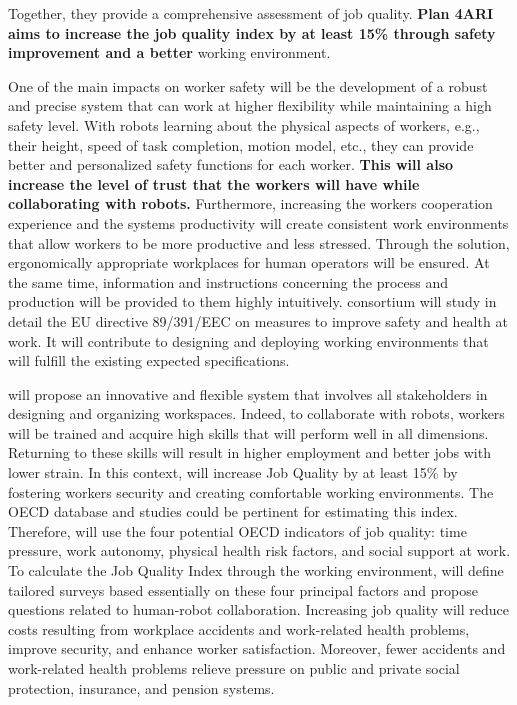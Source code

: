 Together, they provide a comprehensive assessment of job quality.
\textbf{Plan 4ARI aims to increase the job quality index by at least
15\% through safety improvement and a better} working environment.

One of the main impacts on worker safety will be the development of a
robust and precise system that can work at higher flexibility while
maintaining a high safety level. With robots learning about the physical
aspects of workers, e.g., their height, speed of task completion, motion
model, etc., they can provide better and personalized safety functions
for each worker. \textbf{This will also increase the level of trust that
the workers will have while collaborating with robots.} Furthermore,
increasing the worker\textquotesingle s cooperation experience and the
system\textquotesingle s productivity will create consistent work
environments that allow workers to be more productive and less stressed.
Through the  solution, ergonomically appropriate
workplaces for human operators will be ensured. At the same time,
information and instructions concerning the process and production will
be provided to them highly intuitively.  consortium
will study in detail the EU directive 89/391/EEC on measures to improve
safety and health at work. It will contribute to designing and deploying
working environments that will fulfill the existing expected
specifications.

 will propose an innovative and flexible system that
involves all stakeholders in designing and organizing workspaces.
Indeed, to collaborate with robots, workers will be trained and acquire
high skills that will perform well in all dimensions. Returning to these
skills will result in higher employment and better jobs with lower
strain. In this context,  will increase Job Quality by
at least 15\% by fostering workers\textquotesingle{} security and
creating comfortable working environments. The OECD database and studies
could be pertinent for estimating this index. Therefore,
 will use the four potential OECD indicators of job
quality: time pressure, work autonomy, physical health risk factors, and
social support at work. To calculate the Job Quality Index through the
working environment,  will define tailored surveys
based essentially on these four principal factors and propose questions
related to human-robot collaboration. Increasing job quality will reduce
costs resulting from workplace accidents and work-related health
problems, improve security, and enhance worker satisfaction. Moreover,
fewer accidents and work-related health problems relieve pressure on
public and private social protection, insurance, and pension systems.

